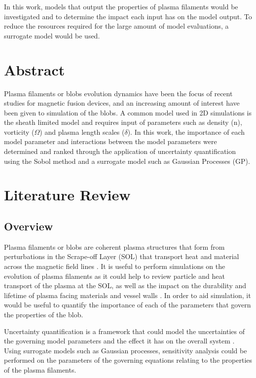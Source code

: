 \documentclass{article}
\begin{document}
In this work, models that output the properties of plasma filaments would be investigated and to determine the impact each input has on the model output. To reduce the resources required for the large amount of model evaluations, a surrogate model would be used.    

\section*{Abstract}
Plasma filaments or blobs evolution dynamics have been the focus of recent studies for magnetic fusion devices, and an increasing amount of interest have been given to simulation of the blobs. A common model used in 2D simulations is the sheath limited model and requires input of parameters such as density (n), vorticity ($\Omega$) and plasma length scales ($\delta$). In this work, the importance of each model parameter and interactions between the model parameters were determined and ranked through the application of uncertainty quantification using the Sobol method and a surrogate model such as Gaussian Processes (GP).

\section*{Literature Review}
\subsection*{Overview}
Plasma filaments or blobs are coherent plasma structures that form from perturbations in the Scrape-off Layer (SOL) that transport heat and material across the magnetic field lines \cite{dippolito_convective_2011, hoare_dynamics_2019}. It is useful to perform simulations on the evolution of plasma filaments as it could help to review particle and heat transport of the plasma at the SOL, as well as the impact on the durability and lifetime of plasma facing materials and vessel walls \cite{carralero_experimental_2015, krasheninnikov_recent_2008}. In order to aid simulation, it would be useful to quantify the importance of each of the parameters that govern the properties of the blob.

Uncertainty quantification is a framework that could model the uncertainties of the governing model parameters and the effect it has on the overall system \cite{sudret_surrogate_2017}. Using surrogate models such as Gaussian processes, sensitivity analysis could be performed on the parameters of the governing equations relating to the properties of the plasma filaments.
\end{document}
